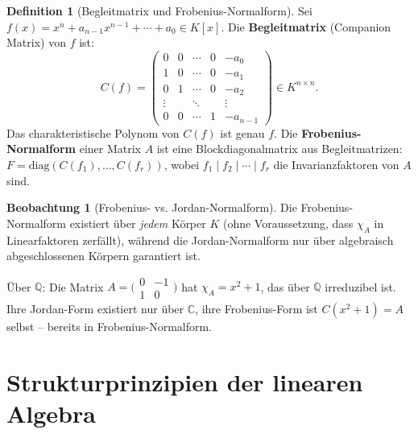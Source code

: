 ﻿\documentclass[a4paper,12pt]{report}
\theoremstyle{definition}
\newtheorem{definition}{Definition}
\newtheorem{beobachtung}{Beobachtung}
\begin{document}
\begin{definition}[Begleitmatrix und Frobenius-Normalform]
    Sei $f(x) = x^n + a_{n-1}x^{n-1} + \cdots + a_0 \in K[x]$.
    Die \textbf{Begleitmatrix} (Companion Matrix) von $f$ ist:
    \[
        C(f) = \begin{pmatrix}
            0 & 0 & \cdots & 0 & -a_0 \\
            1 & 0 & \cdots & 0 & -a_1 \\
            0 & 1 & \cdots & 0 & -a_2 \\
            \vdots & & \ddots & & \vdots \\
            0 & 0 & \cdots & 1 & -a_{n-1}
        \end{pmatrix} \in K^{n \times n}.
    \]
    Das charakteristische Polynom von $C(f)$ ist genau $f$.
    Die \textbf{Frobenius-Normalform} einer Matrix $A$ ist eine
    Blockdiagonalmatrix aus Begleitmatrizen:
    $F = \mathrm{diag}(C(f_1), \ldots, C(f_r))$, wobei
    $f_1 \mid f_2 \mid \cdots \mid f_r$ die Invarianzfaktoren von $A$ sind.
\end{definition}

\begin{beobachtung}[Frobenius- vs. Jordan-Normalform]
    Die Frobenius-Normalform existiert über \emph{jedem} Körper $K$
    (ohne Voraussetzung, dass $\chi_A$ in Linearfaktoren zerfällt),
    während die Jordan-Normalform nur über algebraisch abgeschlossenen
    Körpern garantiert ist.

    Über $\mathbb{Q}$: Die Matrix $A = \bigl(\begin{smallmatrix}0&-1\\1&0\end{smallmatrix}\bigr)$
    hat $\chi_A = x^2 + 1$, das über $\mathbb{Q}$ irreduzibel ist.
    Ihre Jordan-Form existiert nur über $\mathbb{C}$, ihre Frobenius-Form
    ist $C(x^2+1) = A$ selbst -- bereits in Frobenius-Normalform.
\end{beobachtung}

\chapter{Strukturprinzipien der linearen Algebra}
\end{document}
